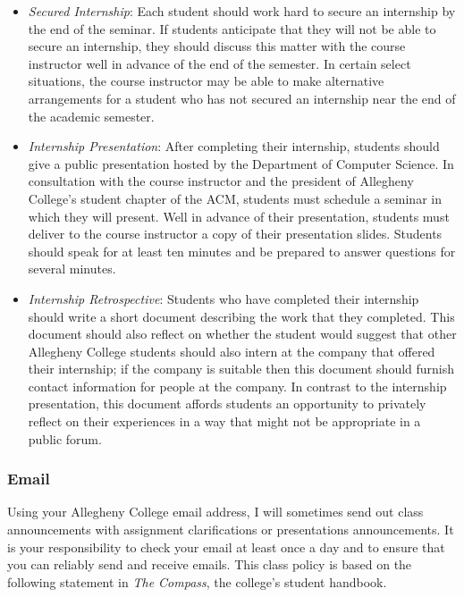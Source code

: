 \begin{itemize}
        \item {\em Secured Internship}: Each student should work hard to secure an internship by the end of the seminar.
          If students anticipate that they will not be able to secure an internship, they should discuss this matter
          with the course instructor well in advance of the end of the semester.  In certain select situations, the
          course instructor may be able to make alternative arrangements for a student who has not secured an internship
          near the end of the academic semester.

	\item {\em Internship Presentation}: After completing their internship, students should give a public presentation
		hosted by the Department of Computer Science. In consultation with the course instructor and the president of
		Allegheny College's student chapter of the ACM, students must schedule a seminar in which they will
		present.  Well in advance of their presentation, students must deliver to the course instructor a copy of their 
		presentation slides.  Students should speak for at least ten minutes and be prepared to answer questions for
		several minutes.     

	\item {\em Internship Retrospective}: Students who have completed their internship should write a short document
		describing the work that they completed.  This document should also reflect on whether the student would suggest
		that other Allegheny College students should also intern at the company that offered their internship;  if the
		company is suitable then this document should furnish contact information for people at the company.  In
		contrast to the internship presentation, this document affords students an opportunity to privately reflect on
		their experiences in a way that might not be appropriate in a public forum.

\end{itemize}

\subsubsection*{Email}

Using your Allegheny College email address, I will sometimes send out class announcements with assignment clarifications
or presentations announcements. It is your responsibility to check your email at least once a day and to ensure that you
can reliably send and receive emails. This class policy is based on the following statement in {\em The Compass}, the
college's student handbook.

